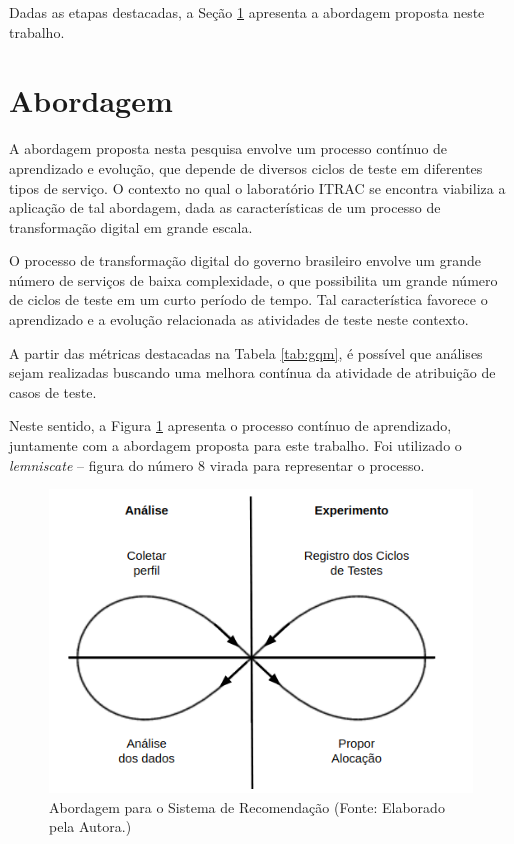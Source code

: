 Dadas as etapas destacadas, a Seção \ref{sec:abordagem} apresenta a abordagem proposta neste trabalho.

\section{Abordagem}
\label{sec:abordagem}

A abordagem proposta nesta pesquisa envolve um processo contínuo de aprendizado e evolução, que depende de diversos ciclos de teste em diferentes tipos de serviço. O contexto no qual o laboratório ITRAC se encontra viabiliza a aplicação de tal abordagem, dada as características de um processo de transformação digital em grande escala.

O processo de transformação digital do governo brasileiro envolve um grande número de serviços de baixa complexidade, o que possibilita um grande número de ciclos de teste em um curto período de tempo. Tal característica favorece o aprendizado e a evolução relacionada as atividades de teste neste contexto.

A partir das métricas destacadas na Tabela \ref{tab:gqm}, é possível que análises sejam realizadas buscando uma melhora contínua da atividade de atribuição de casos de teste.

Neste sentido, a Figura \ref{fig:Abordagem} apresenta o processo contínuo de aprendizado, juntamente com a abordagem proposta para este trabalho. Foi utilizado o \textit{lemniscate} – figura do número 8 virada para representar o processo.

        \begin{figure}[h]
          \centering
          \includegraphics[width=13cm]{figuras/abordagem.png}
          \caption{Abordagem para o Sistema de Recomendação  (Fonte: Elaborado pela Autora.)}
          \label{fig:Abordagem}

        \end{figure}


